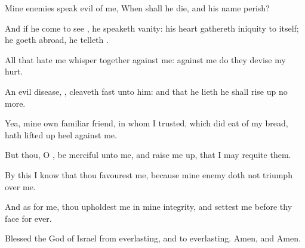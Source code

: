 {\Q {}Mine
enemies
speak
evil of me, When shall he
die, and his
name
perish?


\par }{\Q {}And if he
come to
see
{}, he
speaketh
vanity: his
heart
gathereth
iniquity to itself;
{} he
goeth
abroad, he
telleth
{}.


\par }{\Q {}All that
hate me
whisper
together against me: against me do they
devise my
hurt.


\par }{\Q {}An
evil
disease,
{}, cleaveth
fast unto him: and
{} that he
lieth he shall rise
up no
more.


\par }{\Q {}Yea, mine own
familiar
friend, in whom I
trusted, which did
eat of my
bread, hath lifted
up
{}
heel against me.


\par }{\Q {}But thou, O
{}, be
merciful unto me, and raise me
up, that I may
requite them.


\par }{\Q {}By this I
know that thou
favourest me, because mine
enemy doth not
triumph over me.


\par }{\Q {}And as for me, thou
upholdest me in mine
integrity, and
settest me before thy
face for
ever.


\par }{\Q {}Blessed
{} the
{}
God of
Israel from
everlasting, and to
everlasting.
Amen, and
Amen.




\par }
